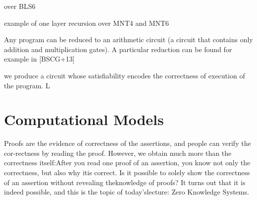 \begin{example}

\end{example}

\begin{example}
over BLS6
\end{example}

\begin{example}
example of one layer recursion over MNT4 and MNT6
\end{example}


\begin{example}

\end{example}

\begin{example}

\end{example}

Any program  can be reduced to  an arithmetic circuit  (a circuit that contains only addition and multiplication gates). A particular reduction can be found for example in [BSCG+13]

 we produce a circuit whose satisfiability encodes the correctness of execution of
the program. L


\section{Computational Models}
Proofs are the evidence of correctness of the assertions, and people can verify the cor-rectness by reading the proof. However, we obtain much more than the correctness itself:After you read one proof of an assertion, you know not only the correctness, but also why itis correct. Is it possible to solely show the correctness of an assertion without revealing theknowledge of proofs? It turns out that it is indeed possible, and this is the topic of today’slecture: Zero Knowledge Systems.


